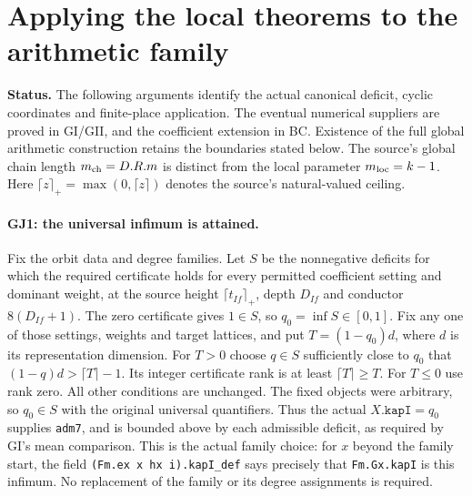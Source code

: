 \documentclass[11pt,a4paper]{article}
\numberwithin{equation}{section}
\theoremstyle{remark}\newtheorem{remark}[theorem]{Remark}
\begin{document}
\section{Applying the local theorems to the arithmetic family}
\label{sec:family-join}

\noindent\textbf{Status.}
The following arguments identify the actual canonical deficit, cyclic
coordinates and finite-place application. The eventual numerical suppliers
are proved in GI/GII, and the coefficient extension in BC. Existence of
the full global arithmetic construction retains the boundaries stated
below. The source's global chain length $m_{\rm ch}=D.R.m$ is distinct
from the local parameter $m_{\rm loc}=k-1$.
Here $\lceil z\rceil_+=\max(0,\lceil z\rceil)$ denotes the source's
natural-valued ceiling.

\paragraph{GJ1: the universal infimum is attained.}
Fix the orbit data and degree families. Let $S$ be the nonnegative
deficits for which the required certificate holds for every permitted
coefficient setting and dominant weight, at the source height
$\lceil t_{If}\rceil_+$, depth $D_{If}$ and conductor $8(D_{If}+1)$.
The zero certificate gives $1\in S$, so $q_0=\inf S\in[0,1]$.
Fix any one of those settings, weights and target lattices, and put
$T=(1-q_0)d$, where $d$ is its representation dimension.
For $T>0$ choose $q\in S$ sufficiently close to $q_0$ that
$(1-q)d>\lceil T\rceil-1$. Its integer certificate rank is at least
$\lceil T\rceil\ge T$. For $T\le0$ use rank zero. All other conditions
are unchanged. The fixed objects were arbitrary, so $q_0\in S$
with the original universal quantifiers. Thus the actual
$X.\texttt{kapI}=q_0$ supplies \texttt{adm7}, and is bounded above by
each admissible deficit, as required by GI's mean comparison.
This is the actual family choice: for $x$ beyond the family start,
the field \texttt{(Fm.ex x hx i).kapI\_def} says precisely that
\texttt{Fm.Gx.kapI} is this infimum. No replacement of the family
or its degree assignments is required.
\end{document}
